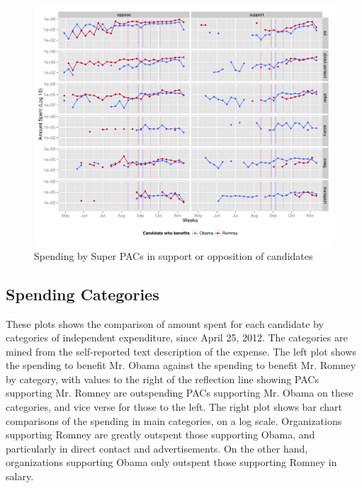 \documentclass[11pt]{article}\usepackage{graphicx, color}
\newenvironment{knitrout}{}{} %
\begin{document}
\begin{knitrout}
\color{fgcolor}\begin{figure}[H]


{\centering \includegraphics[width=\textwidth]{figure/temporal_plot} 

}

\caption[Spending by Super PACs in support or opposition of candidates]{Spending by Super PACs in support or opposition of candidates\label{fig:temporal_plot}}
\end{figure}

\end{knitrout}



\subsection{Spending Categories}
These plots shows the comparison of amount spent for each candidate by categories of independent expenditure, since April 25, 2012. The categories are mined from the self-reported text description of the expense. The left plot shows the spending to benefit Mr. Obama against the spending to benefit Mr. Romney by category, with values to the right of the reflection line showing PACs supporting Mr. Romney are outspending PACs supporting Mr. Obama on these categories, and vice verse for those to the left. The right plot shows bar chart comparisons of the spending in main categories, on a log scale.
Organizations supporting Romney are greatly outspent those supporting Obama, and particularly in direct contact and advertisements. On the other hand, organizations supporting Obama only outspent those supporting Romney in salary. 
\end{document}
